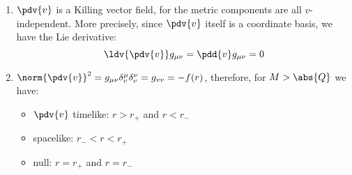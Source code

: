 \documentclass[a4paper
	,10pt
]{article}
\begin{document}
\begin{enumerate}
\begin{enumerate}[parsep=\parskip]
	\item $\pdv{v}$ is a Killing vector field, for the metric components are all $v$-independent. More precisely, since $\pdv{v}$ itself is a coordinate basis, we have the Lie derivative:
	\begin{equation}
		\ldv{\pdv{v}} g_{\mu\nu}
		= \pdd{v} g_{\mu\nu}
		= 0
	\end{equation}
	
	\item $
		\norm{\pdv{v}}^2
		= g_{\mu\nu} \delta^\mu_v \delta^\nu_v
		= g_{vv}
		= -f(r)
	$, therefore, for $M > \abs{Q}$ we have:
	\begin{itemize}[topsep=.3\baselineskip]
	\item $\pdv{v}$ timelike: $r > r_+$ and $r < r_-$
	\item spacelike: $r_- < r < r_+$
	\item null: $r = r_+$ and $r = r_-$
	\end{itemize}
	
	\end{enumerate}
\end{enumerate}
\end{document}
